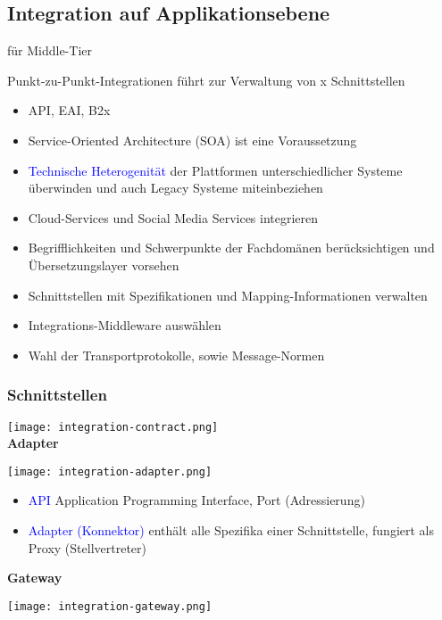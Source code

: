 \subsection{Integration auf Applikationsebene}
für Middle-Tier

Punkt-zu-Punkt-Integrationen führt zur Verwaltung von x Schnittstellen

\begin{itemize}
    \item API, EAI, B2x
    \item Service-Oriented Architecture (SOA) ist eine Voraussetzung
    \item \textcolor{blue}{Technische Heterogenität} der Plattformen unterschiedlicher Systeme überwinden und auch Legacy Systeme miteinbeziehen
    \item Cloud-Services und Social Media Services integrieren
    \item Begrifflichkeiten und Schwerpunkte der Fachdomänen berücksichtigen und Übersetzungslayer vorsehen
    \item Schnittstellen mit Spezifikationen und Mapping-Informationen verwalten
    \item Integrations-Middleware auswählen
    \item Wahl der Transportprotokolle, sowie Message-Normen
\end{itemize}
\vspace{10pt}

\subsubsection{Schnittstellen}

\texttt{[image: integration-contract.png]} \\

\textbf{Adapter}

\texttt{[image: integration-adapter.png]} \\

\begin{itemize}
    \item \textcolor{blue}{API} Application Programming Interface, Port (Adressierung)
    \item \textcolor{blue}{Adapter (Konnektor)} enthält alle Spezifika einer Schnittstelle, fungiert als Proxy (Stellvertreter)
\end{itemize}
\vspace{10pt}
\textbf{Gateway}

\texttt{[image: integration-gateway.png]} \\

